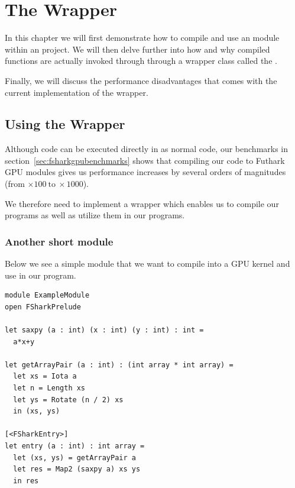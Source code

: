 \chapter{The \fshark{} Wrapper}
In this chapter we will first demonstrate how to compile and use an \fshark{}
module within an \fsharp{} project.
We will then delve further into how and why compiled \fshark{} functions are actually
invoked through through a wrapper class called the \fsharkwrapper{}.

Finally, we will discuss the performance disadvantages that comes with the
current implementation of the \fshark{} wrapper.

\section{Using the \fshark{} Wrapper}
\label{sec:fsharkcompiler}
Although \fshark{} code can be executed directly in \fsharp{} as normal
\fsharp{} code, our benchmarks in section~\ref{sec:fsharkgpubenchmarks} shows
that compiling our \fshark{} code to Futhark GPU modules gives us performance
increases by several orders of magnitudes (from $\times 100~\text{to}~\times 1000$).

We therefore need to implement a wrapper which enables us to compile our
\fshark{} programs as well as utilize them in our \fsharp{} programs.
\subsection{Another short \fshark{} module}
Below we see a simple \fshark{} module that we
want to compile into a GPU kernel and use in our \fsharp{} program.

\begin{verbatim}
module ExampleModule
open FSharkPrelude

let saxpy (a : int) (x : int) (y : int) : int =
  a*x+y

let getArrayPair (a : int) : (int array * int array) =
  let xs = Iota a
  let n = Length xs
  let ys = Rotate (n / 2) xs
  in (xs, ys)

[<FSharkEntry>]
let entry (a : int) : int array =
  let (xs, ys) = getArrayPair a
  let res = Map2 (saxpy a) xs ys
  in res
\end{verbatim}


